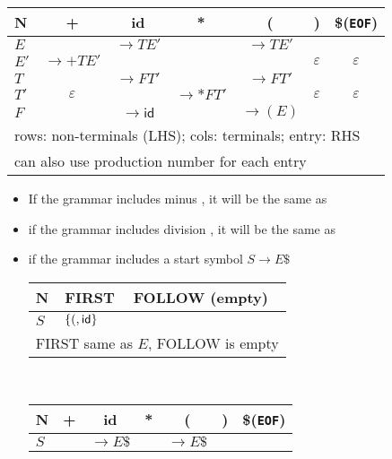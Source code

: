 \documentclass[10pt,a4paper,landscape]{article}
\begin{document}
\begin{multicols*}{3}
\begin{enumerate}
  \begin{tabular}{l|c|c|c|c|c|c}
  \hline
  N       & +          & id  & *          & (           & )   & \$(\texttt{EOF})\\
  \hline
  \(E\)   &            &\(\to TE'\)&      & \(\to TE'\) && \\
  \(E'\)  &\(\to +TE'\)&     &            &  &\(\varepsilon\) &\(\varepsilon\)\\
  \(T\)   &            &\(\to FT'\)    &                &\(\to FT'\) &\\
  \(T'\)  &\(\varepsilon\) & &\(\to *FT'\)&  &\(\varepsilon\)&\(\varepsilon\)\\
  \(F\)   &            &\(\to \mathsf{id}\)& &\(\to (E)\)&&\\
  \hline
  \multicolumn{7}{l}{rows: non-terminals (LHS); cols: terminals; entry: RHS}\\
  \hline
  \multicolumn{7}{l}{can also use production number for each entry}\\
  \hline
  \end{tabular}
\end{enumerate}
\begin{itemize}
\item If the grammar includes minus \mb{-}, it will be the same as \mb{+}
\item if the grammar includes division \mb{$\boldsymbol{\backslash}$}, it will be the same as \mb{*}
\item if the grammar includes a start symbol $S\to E\$$
  \begin{center}
  \begin{tabular}{l|l|l}
    \hline
    N      & \textsf{FIRST} & \textsf{FOLLOW} (empty) \\
    \hline
    \(S\)  & \(\{(,\mathsf{id}\}\) & \\
    \hline
    \multicolumn{3}{l}{FIRST same as $E$, FOLLOW is empty}\\
    \hline
  \end{tabular}\\
  \begin{tabular}{l|c|c|c|c|c|c}
  \hline
  N       & +          & id  & *          & (           & )   & \$(\texttt{EOF})\\
  \hline
  \(S\)   &            &\(\to E\$\)&      & \(\to E\$\) && \\
  \hline
  \end{tabular}
  \end{center}
\end{itemize}
\end{multicols*}
\end{document}
